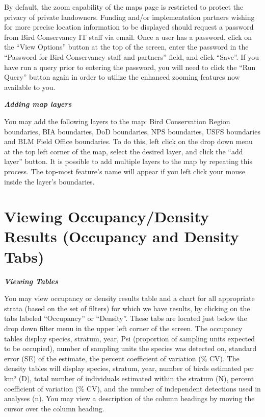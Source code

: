 \documentclass[
  letterpaper,
  DIV=11,
  numbers=noendperiod,
  oneside]{scrreprt}
\begin{document}
By default, the zoom capability of the maps page is restricted to
protect the privacy of private landowners. Funding and/or implementation
partners wishing for more precise location information to be displayed
should request a password from Bird Conservancy IT staff via email. Once
a user has a password, click on the ``View Options'' button at the top
of the screen, enter the password in the ``Password for Bird Conservancy
staff and partners'' field, and click ``Save''. If you have run a query
prior to entering the password, you will need to click the ``Run Query''
button again in order to utilize the enhanced zooming features now
available to you.

\textbf{\emph{Adding map layers}}

You may add the following layers to the map: Bird Conservation Region
boundaries, BIA boundaries, DoD boundaries, NPS boundaries, USFS
boundaries and BLM Field Office boundaries. To do this, left click on
the drop down menu at the top left corner of the map, select the desired
layer, and click the ``add layer'' button. It is possible to add
multiple layers to the map by repeating this process. The top-most
feature's name will appear if you left click your mouse inside the
layer's boundaries.

\hypertarget{viewing-occupancydensity-results-occupancy-and-density-tabs}{%
\section*{Viewing Occupancy/Density Results (Occupancy and Density
Tabs)}\label{viewing-occupancydensity-results-occupancy-and-density-tabs}}


\textbf{\emph{Viewing Tables}}

You may view occupancy or density results table and a chart for all
appropriate strata (based on the set of filters) for which we have
results, by clicking on the tabs labeled ``Occupancy'' or ``Density''.
These tabs are located just below the drop down filter menu in the upper
left corner of the screen. The occupancy tables display species,
stratum, year, Psi (proportion of sampling units expected to be
occupied), number of sampling units the species was detected on,
standard error (SE) of the estimate, the percent coefficient of
variation (\% CV). The density tables will display species, stratum,
year, number of birds estimated per km² (D), total number of individuals
estimated within the stratum (N), percent coefficient of variation (\%
CV), and the number of independent detections used in analyses (n). You
may view a description of the column headings by moving the cursor over
the column heading.
\end{document}
